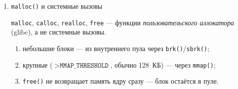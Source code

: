 \begin{enumerate}
\begin{enumerate}
\texttt{mlock(addr, len)} — фиксирует страницы в RAM, запрещая выгрузку в
swap. Применяется в real-time приложениях и для криптографических ключей.

\texttt{munlock()} — снимает фиксацию; \texttt{mlockall(MCL\_CURRENT)} —
для всего адресного пространства.

\item \texttt{mprotect()}

\texttt{mprotect(addr, len, prot)} — изменяет права доступа к страницам:
\texttt{PROT\_READ}, \texttt{PROT\_WRITE}, \texttt{PROT\_EXEC},
\texttt{PROT\_NONE}.

\texttt{PROT\_NONE} используется для \emph{guard pages} — обращение к ним
приводит к \texttt{SIGSEGV}.

\item \texttt{madvise()}, \texttt{posix\_madvise()}

\texttt{madvise(addr, len, advice)} — передаёт ядру советы по работе с
диапазоном:
\begin{enumerate}
    \item \texttt{MADV\_SEQUENTIAL} — ожидается последовательный доступ;
    \item \texttt{MADV\_RANDOM} — случайный доступ, readahead не нужен;
    \item \texttt{MADV\_WILLNEED} — диапазон скоро потребуется;
    \item \texttt{MADV\_DONTNEED} — диапазон пока не нужен;
    \item \texttt{MADV\_HUGEPAGE} / \texttt{MADV\_NOHUGEPAGE} — THP;
    \item \texttt{MADV\_MERGEABLE} — пометить для KSM.
\end{enumerate}

\texttt{posix\_madvise()} — POSIX-аналог с другим набором констант.
\end{enumerate}

\item \texttt{malloc()} и системные вызовы \label{sec:5}

\texttt{malloc}, \texttt{calloc}, \texttt{realloc}, \texttt{free} — функции
\emph{пользовательского аллокатора} (glibc), а не системные вызовы.

\begin{enumerate}
    \item небольшие блоки — из внутреннего пула через \texttt{brk()}/\texttt{sbrk()};
    \item крупные (\(> \texttt{MMAP\_THRESHOLD}\), обычно 128~КБ) — через \texttt{mmap()};
    \item \texttt{free()} не возвращает память ядру сразу — блок остаётся в пуле.
\end{enumerate}



\end{enumerate}
